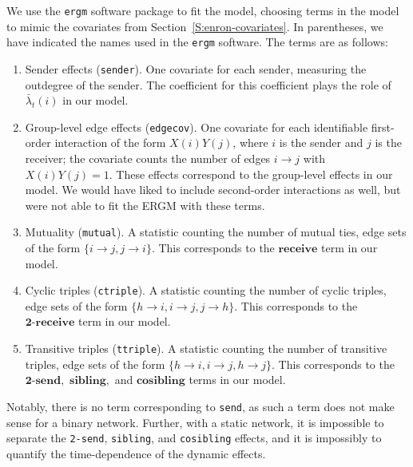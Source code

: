 \documentclass[final]{statsoc}
\begin{document}
We use the \texttt{ergm} software package to fit the model, choosing
terms in the model to mimic the covariates from
Section~\ref{S:enron-covariates}.  In parentheses, we have indicated the
names used in the \texttt{ergm} software.  The terms are as follows:
\begin{enumerate}
  \item Sender effects (\texttt{sender}).  One covariate for each sender,
  measuring the outdegree of the sender.  The coefficient for this coefficient
plays the role of $\bar \lambda_t(i)$ in our model.
  
  \item Group-level edge effects (\texttt{edgecov}).  One covariate for each
identifiable first-order interaction of the form $X(i) Y(j)$, where $i$ is the
sender and $j$ is the receiver; the covariate counts the number of edges $i
\to j$ with $X(i) Y(j) = 1$.  These effects correspond to the group-level
effects in our model.  We would have liked to include second-order
interactions as well, but were not able to fit the ERGM with these terms.

  \item Mutuality (\texttt{mutual}).  A statistic counting the number of
mutual ties, edge sets of the form $\{ i \to j, j \to i \}$.  This corresponds to the
$\textbf{receive}$ term in our model.

  \item Cyclic triples (\texttt{ctriple}).  A statistic counting the number of
cyclic triples, edge sets of the form $\{ h \to i, i \to j, j \to h \}$.  This
corresponds to the $\textbf{2-receive}$ term in our model.

  \item Transitive triples (\texttt{ttriple}).  A statistic counting the
number of transitive triples, edge sets of the form $\{ h \to i, i \to j, h
\to j \}$.  This corresponds to the $\textbf{2-send},$ $\textbf{sibling},$
and $\textbf{cosibling}$ terms in our model.
\end{enumerate}

\noindent
Notably, there is no term corresponding to \texttt{send}, as such a term does
not make sense for a binary network.  Further, with a static network, it is
impossible to separate the \texttt{2-send}, \texttt{sibling}, and
\texttt{cosibling} effects, and it is impossibly to quantify the
time-dependence of the dynamic effects.
\end{document}
